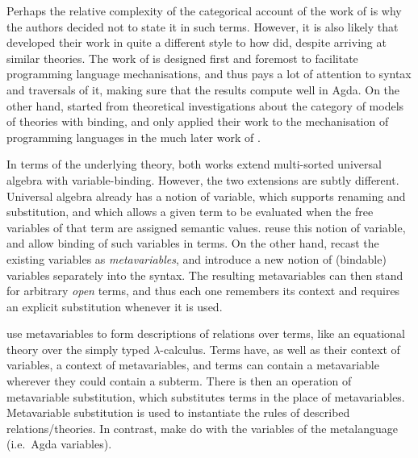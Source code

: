 Perhaps the relative complexity of the categorical account of the work of
\citet{AACMM21} is why the authors decided not to state it in such terms.
However, it is also likely that \citeauthor{AACMM21} developed their work in
quite a different style to how \citeauthor{FPT99} did, despite arriving at
similar theories.
The work of \citet{AACMM21} is designed first and foremost to facilitate
programming language mechanisations, and thus pays a lot of attention to syntax
and traversals of it, making sure that the results compute well in Agda.
On the other hand, \citeauthor{FPT99} started from theoretical investigations
about the category of models of theories with binding, and only applied their
work to the mechanisation of programming languages in the much later work of
\citet{FS22}.

In terms of the underlying theory, both works extend multi-sorted universal
algebra with variable-binding.
However, the two extensions are subtly different.
Universal algebra already has a notion of variable, which supports renaming and
substitution, and which allows a given term to be evaluated when the free
variables of that term are assigned semantic values.
\citeauthor{AACMM21} reuse this notion of variable, and allow binding of such
variables in terms.
On the other hand, \citeauthor{FS22} recast the existing variables as
\emph{metavariables}, and introduce a new notion of (bindable) variables
separately into the syntax.
The resulting metavariables can then stand for arbitrary \emph{open} terms, and
thus each one remembers its context and requires an explicit substitution
whenever it is used.


 use metavariables to form descriptions of relations over
terms, like an equational theory over the simply typed $\lambda$-calculus.
Terms have, as well as their context of variables, a context of metavariables,
and terms can contain a metavariable wherever they could contain a subterm.
There is then an operation of metavariable substitution, which substitutes terms
in the place of metavariables.
Metavariable substitution is used to instantiate the rules of described
relations/theories.
In contrast, \citeauthor{AACMM21} make do with the variables of the metalanguage
(i.e.\ Agda variables).

